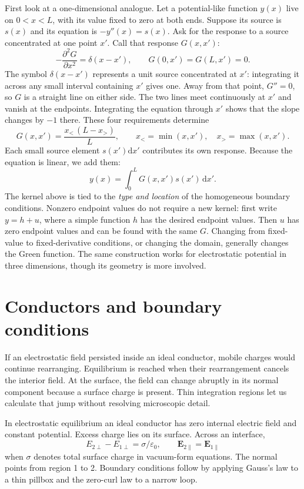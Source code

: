 \documentclass[11pt,oneside]{book}
\newcommand{\dd}{\mathrm{d}}
\newcommand{\vect}[1]{\boldsymbol{#1}}
\newcommand{\eps}{\varepsilon_0}
\theoremstyle{reviewstyle}
\begin{document}
First look at a one-dimensional analogue. Let a potential-like function $y(x)$ live on $0<x<L$, with its value fixed to zero at both ends. Suppose its source is $s(x)$ and its equation is $-y''(x)=s(x)$. Ask for the response to a source concentrated at one point $x'$. Call that response $G(x,x')$:
\begin{equation}
-\frac{\partial^2G}{\partial x^2}=\delta(x-x'),
\qquad G(0,x')=G(L,x')=0.
\end{equation}
The symbol $\delta(x-x')$ represents a unit source concentrated at $x'$: integrating it across any small interval containing $x'$ gives one. Away from that point, $G''=0$, so $G$ is a straight line on either side. The two lines meet continuously at $x'$ and vanish at the endpoints. Integrating the equation through $x'$ shows that the slope changes by $-1$ there. These four requirements determine
\begin{equation}
G(x,x')=\frac{x_<\,(L-x_>)}{L},\qquad
x_<=\min(x,x'),\quad x_>=\max(x,x').
\end{equation}
Each small source element $s(x')\dd x'$ contributes its own response. Because the equation is linear, we add them:
\begin{equation}
y(x)=\int_0^L G(x,x')s(x')\,\dd x'.
\end{equation}
The kernel above is tied to the \emph{type and location} of the homogeneous boundary conditions. Nonzero endpoint values do not require a new kernel: first write $y=h+u$, where a simple function $h$ has the desired endpoint values. Then $u$ has zero endpoint values and can be found with the same $G$. Changing from fixed-value to fixed-derivative conditions, or changing the domain, generally changes the Green function. The same construction works for electrostatic potential in three dimensions, though its geometry is more involved.

\section{Conductors and boundary conditions}
If an electrostatic field persisted inside an ideal conductor, mobile charges would continue rearranging. Equilibrium is reached when their rearrangement cancels the interior field. At the surface, the field can change abruptly in its normal component because a surface charge is present. Thin integration regions let us calculate that jump without resolving microscopic detail.

In electrostatic equilibrium an ideal conductor has zero internal electric field and constant potential. Excess charge lies on its surface. Across an interface,
\begin{equation}E_{2\perp}-E_{1\perp}=\sigma/\eps,\qquad \vect E_{2\parallel}=\vect E_{1\parallel}\end{equation}
when $\sigma$ denotes total surface charge in vacuum-form equations. The normal points from region 1 to 2. Boundary conditions follow by applying Gauss's law to a thin pillbox and the zero-curl law to a narrow loop.
\end{document}
